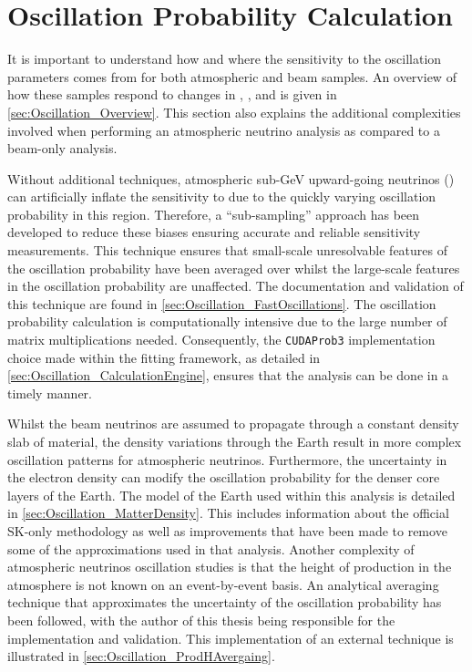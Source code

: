 \chapter{Oscillation Probability Calculation}
\label{chap:OscillationProbability}

It is important to understand how and where the sensitivity to the oscillation parameters comes from for both atmospheric and beam samples. An overview of how these samples respond to changes in , , and  is given in \autoref{sec:Oscillation_Overview}. This section also explains the additional complexities involved when performing an atmospheric neutrino analysis as compared to a beam-only analysis.

Without additional techniques, atmospheric sub-GeV upward-going neutrinos () can artificially inflate the sensitivity to  due to the quickly varying oscillation probability in this region. Therefore, a ``sub-sampling'' approach has been developed to reduce these biases ensuring accurate and reliable sensitivity measurements. This technique ensures that small-scale unresolvable features of the oscillation probability have been averaged over whilst the large-scale features in the oscillation probability are unaffected. The documentation and validation of this technique are found in \autoref{sec:Oscillation_FastOscillations}. The oscillation probability calculation is computationally intensive due to the large number of matrix multiplications needed. Consequently, the \texttt{CUDAProb3} implementation choice made within the fitting framework, as detailed in \autoref{sec:Oscillation_CalculationEngine}, ensures that the analysis can be done in a timely manner.

Whilst the beam neutrinos are assumed to propagate through a constant density slab of material, the density variations through the Earth result in more complex oscillation patterns for atmospheric neutrinos. Furthermore, the uncertainty in the electron density can modify the oscillation probability for the denser core layers of the Earth. The model of the Earth used within this analysis is detailed in \autoref{sec:Oscillation_MatterDensity}. This includes information about the official SK-only methodology as well as improvements that have been made to remove some of the approximations used in that analysis. Another complexity of atmospheric neutrinos oscillation studies is that the height of production in the atmosphere is not known on an event-by-event basis. An analytical averaging technique that approximates the uncertainty of the oscillation probability has been followed, with the author of this thesis being responsible for the implementation and validation. This implementation of an external technique is illustrated in \autoref{sec:Oscillation_ProdHAvergaing}.

